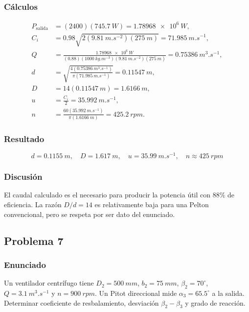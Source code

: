 \documentclass[12pt]{article}
\newcommand{\resultado}[1]{\[
  \boxed{\displaystyle #1}
\]}
\begin{document}
\subsubsection*{Cálculos}
\begin{align*}
P_{\mathrm{salida}}&=(2400)(\SI{745.7}{W})
=\SI{1.78968e6}{W},\\
C_i&=0.98\sqrt{2(\SI{9.81}{m.s^{-2}})(\SI{275}{m})}
=\SI{71.985}{m.s^{-1}},\\
Q&=\frac{\SI{1.78968e6}{W}}
{(0.88)(\SI{1000}{kg.m^{-3}})(\SI{9.81}{m.s^{-2}})(\SI{275}{m})}
=\SI{0.75386}{m^3.s^{-1}},\\
d&=\sqrt{\frac{4(\SI{0.75386}{m^3.s^{-1}})}
{\pi(\SI{71.985}{m.s^{-1}})}}=\SI{0.11547}{m},\\
D&=14(\SI{0.11547}{m})=\SI{1.6166}{m},\\
u&=\frac{C_i}{2}=\SI{35.992}{m.s^{-1}},\\
n&=\frac{60(\SI{35.992}{m.s^{-1}})}
{\pi(\SI{1.6166}{m})}=\SI{425.2}{rpm}.
\end{align*}

\subsubsection*{Resultado}
\resultado{d=\SI{0.1155}{m},\quad D=\SI{1.617}{m},\quad
u=\SI{35.99}{m.s^{-1}},\quad n\approx\SI{425}{rpm}}

\subsubsection*{Discusión}
El caudal calculado es el necesario para producir la potencia útil con 88\% de eficiencia.
La razón $D/d=14$ es relativamente baja para una Pelton convencional, pero se respeta por
ser dato del enunciado.

\subsection{Problema 7}

\subsubsection*{Enunciado}
Un ventilador centrífugo tiene $D_2=\SI{500}{mm}$, $b_2=\SI{75}{mm}$,
$\beta_2=70^\circ$, $Q=\SI{3.1}{m^3.s^{-1}}$ y $n=\SI{900}{rpm}$. Un Pitot direccional
mide $\alpha_3=65.5^\circ$ a la salida. Determinar coeficiente de resbalamiento, desviación
$\beta_2-\beta_3$ y grado de reacción.
\end{document}
